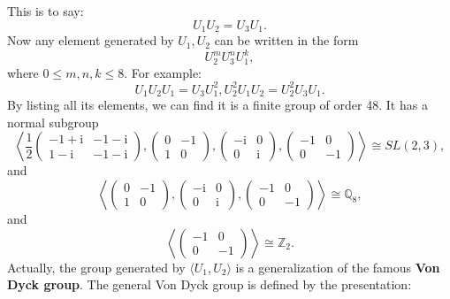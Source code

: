 This is to say:
\begin{equation*}
U_{1} U_{2} =U_{3} U_{1} .
\end{equation*}
Now any element generated by $U_{1} ,U_{2}$ can be written in the form
\begin{equation*}
U_{2}^{m} U_{3}^{n} U_{1}^{k} ,
\end{equation*}
where $0\leq m,n,k\leq 8$. For example:
\begin{equation*}
U_{1} U_{2} U_{1} =U_{3} U_{1}^{2} ,U_{2}^{2} U_{1} U_{2} =U_{2}^{2} U_{3} U_{1} .
\end{equation*}
By listing all its elements, we can find it is a finite group of order 48. It has a normal subgroup\cite{GAP4}
\begin{equation*}
\left< \frac{1}{2}\begin{pmatrix}
-1+\mathrm{i} & -1-\mathrm{i}\\
1-\mathrm{i} & -1-\mathrm{i}
\end{pmatrix} ,\begin{pmatrix}
0 & -1\\
1 & 0
\end{pmatrix} ,\begin{pmatrix}
-\mathrm{i} & 0\\
0 & \mathrm{i}
\end{pmatrix} ,\begin{pmatrix}
-1 & 0\\
0 & -1
\end{pmatrix}\right> \cong SL( 2,3) ,
\end{equation*}
and
\begin{equation*}
\left< \begin{pmatrix}
0 & -1\\
1 & 0
\end{pmatrix} ,\begin{pmatrix}
-\mathrm{i} & 0\\
0 & \mathrm{i}
\end{pmatrix} ,\begin{pmatrix}
-1 & 0\\
0 & -1
\end{pmatrix}\right> \cong \mathbb{Q}_{8} ,
\end{equation*}
and
\begin{equation*}
\left< \begin{pmatrix}
-1 & 0\\
0 & -1
\end{pmatrix}\right> \cong \mathbb{Z}_{2} .
\end{equation*}
Actually, the group generated by $\langle U_{1} ,U_{2} \rangle $ is a generalization of the famous \textbf{Von Dyck group}\cite{stoytchev2020class}. The general Von Dyck group is defined by the presentation:
